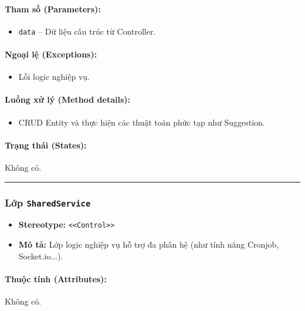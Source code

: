 \documentclass[12pt,a4paper]{article}
\begin{document}
\paragraph{Tham số (Parameters):}
\begin{itemize}[leftmargin=*]
    \item \texttt{data} – Dữ liệu cấu trúc từ Controller.
\end{itemize}


\paragraph{Ngoại lệ (Exceptions):}
\begin{itemize}[leftmargin=*]
    \item Lỗi logic nghiệp vụ.
\end{itemize}


\paragraph{Luồng xử lý (Method details):}
\begin{itemize}[leftmargin=*]
    \item CRUD Entity và thực hiện các thuật toán phức tạp như Suggestion.
\end{itemize}


\paragraph{Trạng thái (States):}
Không có.

\vskip 0.5cm
\noindent\rule{\textwidth}{0.5pt}
\vskip 0.5cm

\subsubsection{Lớp \texttt{SharedService}}

\begin{itemize}[leftmargin=*]
    \item \textbf{Stereotype:} \texttt{\textless{}\textless{}Control\textgreater{}\textgreater{}}
    \item \textbf{Mô tả:} Lớp logic nghiệp vụ hỗ trợ đa phân hệ (như tính năng Cronjob, Socket.io...).
\end{itemize}

\paragraph{Thuộc tính (Attributes):}
Không có.
\end{document}
